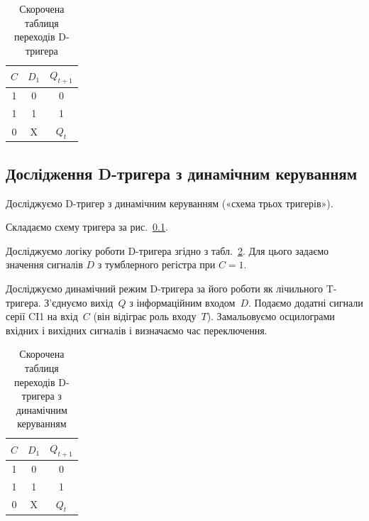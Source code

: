 \documentclass[a4paper,oneside,DIV=10,12pt]{scrartcl}
\begin{document}
			\begin{table}[!htbp]
			\centering
				\begin{tabular}{ccc}
					\toprule
						$C$ & $D_1$ & $Q_{t + 1}$\\
					\midrule
						1 & 0 & 0\\
						1 & 1 & 1\\
						0 & X & $Q_{t}$\\
					\bottomrule
				\end{tabular}
			\caption{Скорочена таблиця переходів D-тригера}
			\label{tab:d-flipflop-excitation-table}
			\end{table}
		
		
		\subsection{Дослідження D-тригера з динамічним керуванням}
			Досліджуємо D-тригер з динамічним керуванням («схема трьох тригерів»).
			\begin{steps}
				\item Складаємо схему тригера за рис.~\ref{}.
				
				\item Досліджуємо логіку роботи D-тригера згідно з табл.~\ref{tab:d-flipflop-dynamic-excitation-table}. Для цього задаємо значення сигналів $D$ з тумблерного регістра при $C = 1$.
				
				\item Досліджуємо динамічний режим D-тригера за його роботи як лічильного T-тригера. З'єднуємо вихід~$Q$ з інформаційним входом~$D$. Подаємо додатні сигнали серії CI1 на вхід~$C$ (він відіграє роль входу~$T$). Замальовуємо осцилограми вхідних і вихідних сигналів і визначаємо час переключення.
			\end{steps}
			
			\begin{table}[!htbp]
			\centering
				\begin{tabular}{ccc}
					\toprule
						$C$ & $D_1$ & $Q_{t + 1}$\\
					\midrule
						1 & 0 & 0\\
						1 & 1 & 1\\
						0 & X & $Q_{t}$\\
					\bottomrule
				\end{tabular}
			\caption{Скорочена таблиця переходів D-тригера з динамічним керуванням}
			\label{tab:d-flipflop-dynamic-excitation-table}
			\end{table}
			
\end{document}
